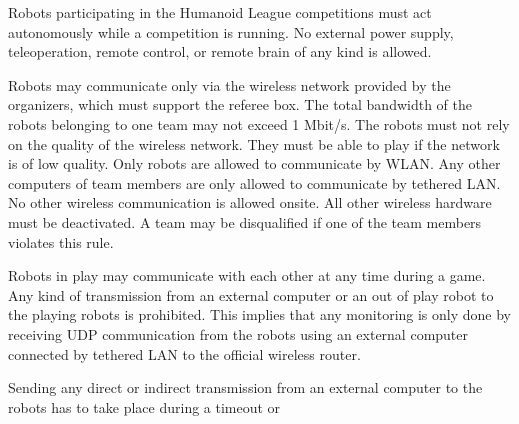 \headlinebox

Robots participating in the Humanoid League competitions must act autonomously while a competition is running. No external power supply, teleoperation, remote control, or remote brain of any kind is allowed.

\bigskip

Robots may communicate only via the wireless network provided by the organizers, which must support the referee box. The total bandwidth of the robots belonging to one team may not exceed 1 Mbit/s. The robots must not rely on the quality of the wireless network. They
must be able to play if the network is of low quality. Only robots are allowed to communicate by WLAN. Any other computers of team members are only allowed to communicate by tethered LAN. No other wireless communication is allowed onsite. All other wireless hardware must be deactivated. A team may be disqualified if one of the team members violates this rule.

\bigskip

Robots in play may communicate with each other at any time during a game. Any kind of transmission from an external computer or an out of play robot to the playing robots is prohibited. This implies that any monitoring is only done by receiving UDP communication from the robots using an external computer connected by tethered LAN to the official wireless router. 

\bigskip

Sending any direct or indirect transmission from an external computer to the robots has to take place during a timeout or  
\bigskip


